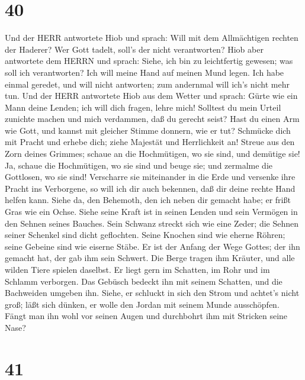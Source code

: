 \hypertarget{section-39}{%
\section{40}\label{section-39}}

 Und der HERR antwortete Hiob und sprach:  Will
mit dem Allmächtigen rechten der Haderer? Wer Gott tadelt, soll's der
nicht verantworten?  Hiob aber antwortete dem HERRN und
sprach:  Siehe, ich bin zu leichtfertig gewesen; was soll
ich verantworten? Ich will meine Hand auf meinen Mund legen.
 Ich habe einmal geredet, und will nicht antworten; zum
andernmal will ich's nicht mehr tun.  Und der HERR
antwortete Hiob aus dem Wetter und sprach:  Gürte wie ein
Mann deine Lenden; ich will dich fragen, lehre mich! 
Solltest du mein Urteil zunichte machen und mich verdammen, daß du
gerecht seist?  Hast du einen Arm wie Gott, und kannst mit
gleicher Stimme donnern, wie er tut?  Schmücke dich mit
Pracht und erhebe dich; ziehe Majestät und Herrlichkeit an!
 Streue aus den Zorn deines Grimmes; schaue an die
Hochmütigen, wo sie sind, und demütige sie!  Ja, schaue die
Hochmütigen, wo sie sind und beuge sie; und zermalme die Gottlosen, wo
sie sind!  Verscharre sie miteinander in die Erde und
versenke ihre Pracht ins Verborgene,  so will ich dir auch
bekennen, daß dir deine rechte Hand helfen kann.  Siehe da,
den Behemoth, den ich neben dir gemacht habe; er frißt Gras wie ein
Ochse.  Siehe seine Kraft ist in seinen Lenden und sein
Vermögen in den Sehnen seines Bauches.  Sein Schwanz
streckt sich wie eine Zeder; die Sehnen seiner Schenkel sind dicht
geflochten.  Seine Knochen sind wie eherne Röhren; seine
Gebeine sind wie eiserne Stäbe.  Er ist der Anfang der Wege
Gottes; der ihn gemacht hat, der gab ihm sein Schwert.  Die
Berge tragen ihm Kräuter, und alle wilden Tiere spielen daselbst.
 Er liegt gern im Schatten, im Rohr und im Schlamm
verborgen.  Das Gebüsch bedeckt ihn mit seinem Schatten,
und die Bachweiden umgeben ihn.  Siehe, er schluckt in sich
den Strom und achtet's nicht groß; läßt sich dünken, er wolle den Jordan
mit seinem Munde ausschöpfen.  Fängt man ihn wohl vor
seinen Augen und durchbohrt ihm mit Stricken seine Nase?

\hypertarget{section-40}{%
\section{41}\label{section-40}}

